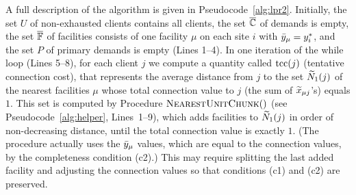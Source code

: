 \documentclass[oneside,final]{ucr}
\begin{document}
A full description of the algorithm is given in
Pseudocode~\ref{alg:lpr2}.  Initially, the set $U$ of
non-exhausted clients contains all clients, the set
$\overline{\mathbb{C}}$ of demands is empty, the set $\overline{\mathbb{F}}$ of
facilities consists of one facility $\mu$ on each site $i$
with ${\bar y}_\mu = y^\ast_i$, and the set $P$ of primary
demands is empty (Lines 1--4).  In one iteration of the
while loop (Lines 5--8), for each client $j$ we
compute a quantity called $\mbox{\rm{tcc}}(j)$ (tentative connection
cost), that represents the average distance from $j$ to the
set ${\widetilde N}_1(j)$ of the nearest facilities $\mu$ whose
total connection value to $j$ (the sum of ${\widetilde x}_{\mu
  j}$'s) equals $1$.  This set is computed by Procedure
${\textsc{NearestUnitChunk}}()$ (see Pseudocode~\ref{alg:helper},
Lines~1--9), which adds facilities to ${\widetilde N}_1(j)$ in
order of non-decreasing distance, until the total connection
value is exactly $1$. (The procedure actually uses the
${\bar y}_\mu$ values, which are equal to the connection values,
by the completeness condition (c2).)  This may require splitting the last added
facility and adjusting the connection values so that
conditions (c1) and (c2) are preserved.
\end{document}
